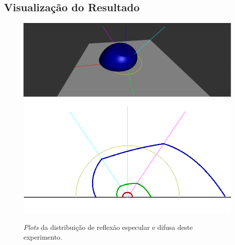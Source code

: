 \subsection{Visualização do Resultado}
\begin{figure}[H]
    \caption{\small{\textit{Plots} da distribuição de reflexão especular e difusa deste experimento.}}
    \label{fig-ashikhmin-shirley-alternative-plots}
    \vspace{42px}
  \includegraphics[width=\linewidth]{./Imagens/brdfs/ashikhmin-shirley-alternative-3D-plot}
\endminipage\hfill
{}
  \includegraphics[width=\linewidth]{./Imagens/brdfs/ashikhmin-shirley-alternative-polar-plot.png}
\endminipage\hfill
\end{figure}

